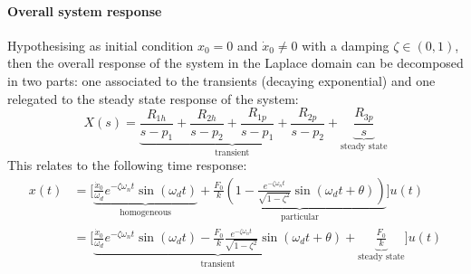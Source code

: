 		\paragraph{Overall system response} Hypothesising as initial condition $x_0 = 0$ and $\dot x_0 \neq0$ with a damping $\zeta \in (0,1)$, then the overall response of the system in the Laplace domain can be decomposed in two parts: one associated to the transients (decaying exponential) and one relegated to the steady state response of the system:
		\begin{equation}
			X(s) = \underbrace{\frac{R_{1h}}{s - p_1} + \frac{R_{2h}}{s-p_2} + \frac{R_{1p}}{s - p_1} + \frac{R_{2p}}{s-p_2} }_\textrm{transient}+ \underbrace{\frac{R_{3p}}{s}}_\textrm{steady state}
		\end{equation}
		This relates to the following time response:
		\begin{equation}
		\begin{split}
			x(t) & = \Bigg[ \underbrace{\frac{\dot x_0}{\omega_d} e^{-\zeta \omega_n t} \sin\left( \omega_d t \right)}_\textrm{homogeneous} + \underbrace{\frac{F_0}{k} \left( 1 - \frac{e^{-\zeta \omega_n t}}{\sqrt{1-\zeta^2}} \sin\left( \omega_d t + \theta \right) \right)}_\textrm{particular}  \Bigg]u(t) \\
			& = \Bigg[ \underbrace{\frac{\dot x_0}{\omega_d} e^{-\zeta \omega_n t} \sin\left( \omega_d t \right) - \frac{F_0}{k}\frac{e^{-\zeta \omega_n t}}{\sqrt{1-\zeta^2}} \sin\left( \omega_d t + \theta \right) }_\textrm{transient} + \underbrace{\frac{F_0}{k}}_\textrm{steady state}  \Bigg]u(t) \\
		\end{split}
		\end{equation} 
	
